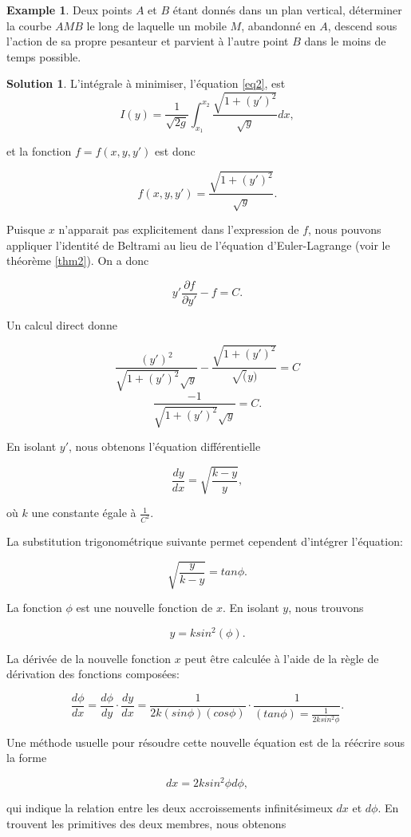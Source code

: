 \documentclass[10pt,a4paper]{article}%
\theoremstyle{theorem}
\theoremstyle{definition}
\newtheorem{example}{Example}
\newtheorem*{solution*}{Solution}
\begin{document}
	\begin{example}
		Deux points $A$ et $B$ étant donnés dans un plan vertical, déterminer la courbe $AMB$ le long de laquelle un mobile $M$, abandonné en $A$, descend sous l'action de sa propre pesanteur et parvient à l'autre point $B$ dans le moins de temps possible.
	\end{example}
	\begin{solution*}
		L'intégrale à minimiser, l'équation \ref{eq2}, est 
		\[I(y)=\frac{1}{\sqrt{2g}}\int_{x_1}^{x_2}\frac{\sqrt{1+(y')^2}}{\sqrt{y}}dx,\]
		
		et la fonction $f=f(x,y,y')$ est donc
		
		\[f(x,y,y')=\frac{\sqrt{1+(y')^2}}{\sqrt{y}}.\]
		
		Puisque $x$ n'apparait pas explicitement dans l'expression de $f$, nous pouvons appliquer l'identité de Beltrami au lieu de l'équation d'Euler-Lagrange (voir le théorème \ref{thm2}). On a donc
		
		\[y'\frac{\partial f}{\partial y'}-f=C.\]
		
		Un calcul direct donne
		
		\[\frac{(y')^2}{\sqrt{1+(y')^2}\sqrt{y}}-\frac{\sqrt{1+(y')^2}}{\sqrt(y)}=C\]
		\[\frac{-1}{\sqrt{1+(y')^2}\sqrt{y}}=C.\]
		
		En isolant $y'$, nous obtenons l'équation différentielle
		
		\[\frac{dy}{dx}=\sqrt{\frac{k-y}{y}},\]
		
		où $k$ une constante égale à $\frac{1}{C^2}.$
		
		La substitution trigonométrique suivante permet cependent d'intégrer l'équation:
		
		\[\sqrt{\frac{y}{k-y}}=tan\phi.\]
		
		La fonction $\phi$ est une nouvelle fonction de $x$. En isolant $y$, nous trouvons 
		
		\[y=ksin^2(\phi).\]
		
		La dérivée de la nouvelle fonction $x$ peut être calculée à l'aide de la règle de dérivation des fonctions composées:
		
		\[\frac{d\phi}{dx}=\frac{d\phi}{dy}\cdot\frac{dy}{dx}=\frac{1}{2k(sin\phi)(cos\phi)}\cdot\frac{1}{(tan\phi)=\frac{1}{2ksin^2\phi}}.\]
		
		Une méthode usuelle pour résoudre cette nouvelle équation est de la réécrire sous la forme
		
		\[dx=2ksin^2\phi d\phi,\]
		
		qui indique la relation entre les deux accroissements infinitésimeux $dx$ et $d\phi$. En trouvent les primitives des deux membres, nous obtenons
		

\end{solution*}
\end{document}
